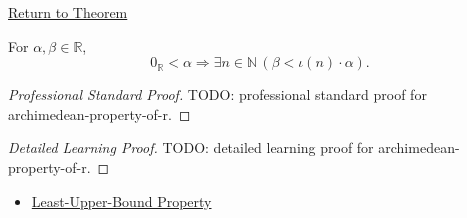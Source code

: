 \newpage
{}
\label{prf:archimedean-property-of-r}

\begin{remark*}[Return]
\hyperref[thm:archimedean-property-of-r]{Return to Theorem}
\end{remark*}

\begin{theorem*}
For $\alpha,\beta\in\mathbb{R}$,
\[
0_{\mathbb{R}}<\alpha
\Longrightarrow
\exists n\in\mathbb{N}\,(\beta<\iota(n)\cdot\alpha).
\]
\end{theorem*}

\begin{proof}[Professional Standard Proof]
\LRAProofBodyStart
TODO: professional standard proof for archimedean-property-of-r.
\end{proof}

\begin{proof}[Detailed Learning Proof]
\LRAProofBodyStart
TODO: detailed learning proof for archimedean-property-of-r.
\end{proof}

\begin{remark*}
\end{remark*}

\begin{dependencies}
\begin{itemize}
  \item \hyperref[thm:lub-property-r]{Least-Upper-Bound Property}
\end{itemize}
\end{dependencies}

\clearpage

